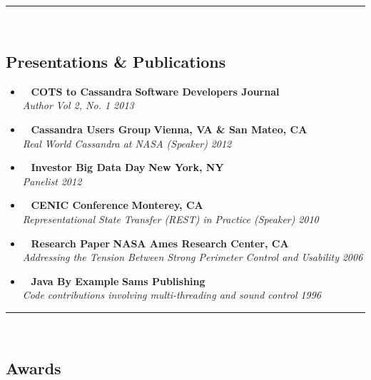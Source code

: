 \hrule\
\vspace{-0.4em}
\subsection*{Presentations \& Publications}

\begin{itemize}
	\parskip=0.1em
	\item\ 
	\headerrow
		{\textbf{COTS to Cassandra}}
		{\textbf{Software Developers Journal}}
	\\
	\headerrow
		{\emph{Author}}
		{\emph{Vol 2, No. 1 2013}}
    \item\ 
	\headerrow
		{\textbf{Cassandra Users Group}}
		{\textbf{Vienna, VA \& San Mateo, CA}}
	\\
	\headerrow
		{\emph{Real World Cassandra at NASA (Speaker)}}
		{\emph{2012}}
	\item\
	\headerrow
		{\textbf{Investor Big Data Day}}
		{\textbf{New York, NY}}
	\\
	\headerrow
		{\emph{Panelist}}
		{\emph{2012}} 
	\item\
    \headerrow
		{\textbf{CENIC Conference}}
		{\textbf{Monterey, CA}}
	\\
	\headerrow
		{\emph{Representational State Transfer (REST) in Practice (Speaker)}}
		{\emph{2010}}
	\item\ 
	\headerrow
		{\textbf{Research Paper}}
		{\textbf{NASA Ames Research Center, CA}}
	\\
	\headerrow
		{\emph{Addressing the Tension Between Strong Perimeter Control and Usability}}
		{\emph{2006}}
	\item\ 
	\headerrow
		{\textbf{Java By Example}}
		{\textbf{Sams Publishing}}
	\\
	\headerrow
		{\emph{Code contributions involving multi-threading and sound control}}
		{\emph{1996}}
\end{itemize}


\hrule\
\vspace{-0.4em}
\subsection*{Awards}

